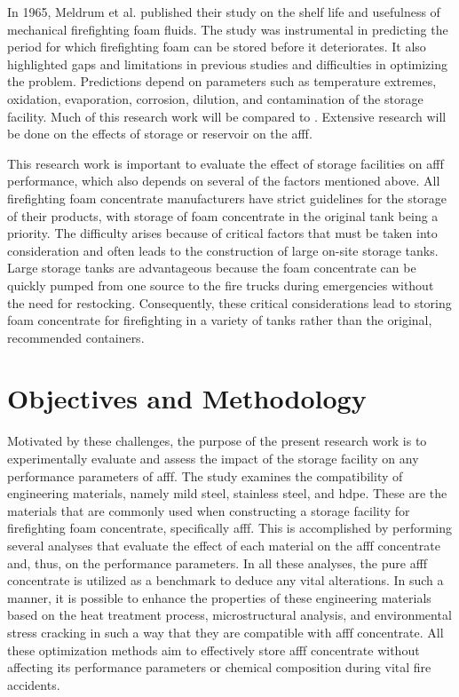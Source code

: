In 1965, Meldrum et al. \cite{meldrum1965storage} published their study on the shelf life and usefulness of mechanical firefighting foam fluids. The study was instrumental in predicting the period for which firefighting foam can be stored before it deteriorates. It also highlighted gaps and limitations in previous studies and difficulties in optimizing the problem. Predictions depend on parameters such as temperature extremes, oxidation, evaporation, corrosion, dilution, and contamination of the storage facility. Much of this research work will be compared to \cite{meldrum1965storage}. Extensive research will be done on the effects of storage or reservoir on the \acrshort{afff}. 

This research work is important to evaluate the effect of storage facilities on \acrshort{afff} performance, which also depends on several of the factors mentioned above. All firefighting foam concentrate manufacturers have strict guidelines for the storage of their products, with storage of foam concentrate in the original tank being a priority. The difficulty arises because of critical factors that must be taken into consideration and often leads to the construction of large on-site storage tanks. Large storage tanks are advantageous because the foam concentrate can be quickly pumped from one source to the fire trucks during emergencies without the need for restocking. Consequently, these critical considerations lead to storing foam concentrate for firefighting in a variety of tanks rather than the original, recommended containers.

\section{Objectives and Methodology}
Motivated by these challenges, the purpose of the present research work is to experimentally evaluate and assess the impact of the storage facility on any performance parameters of \acrshort{afff}. The study examines the compatibility of engineering materials, namely mild steel, stainless steel, and \acrfull{hdpe}. These are the materials that are commonly used when constructing a storage facility for firefighting foam concentrate, specifically \acrshort{afff}. This is accomplished by performing several analyses that evaluate the effect of each material on the \acrshort{afff} concentrate and, thus, on the performance parameters. In all these analyses, the pure \acrshort{afff} concentrate is utilized as a benchmark to deduce any vital alterations. In such a manner, it is possible to enhance the properties of these engineering materials based on the heat treatment process, microstructural analysis, and environmental stress cracking in such a way that they are compatible with \acrshort{afff} concentrate. All these optimization methods aim to effectively store \acrshort{afff} concentrate without affecting its performance parameters or chemical composition during vital fire accidents.  


